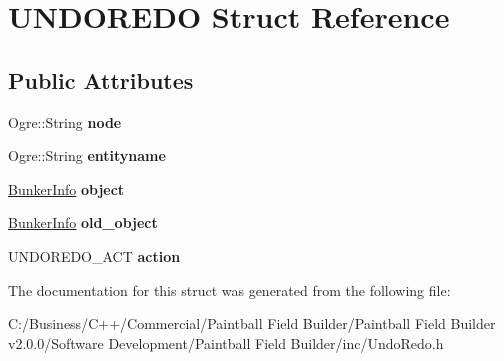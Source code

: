 \hypertarget{struct_u_n_d_o_r_e_d_o}{
\section{UNDOREDO Struct Reference}
\label{struct_u_n_d_o_r_e_d_o}
}
\subsection*{Public Attributes}
\begin{DoxyCompactItemize}
\item 
\hypertarget{struct_u_n_d_o_r_e_d_o_a40e400536f857b0c7885bf94410992e0}{
Ogre::String {\bfseries node}}
\label{struct_u_n_d_o_r_e_d_o_a40e400536f857b0c7885bf94410992e0}

\item 
\hypertarget{struct_u_n_d_o_r_e_d_o_aeec0705a112be8aead229abda745dee9}{
Ogre::String {\bfseries entityname}}
\label{struct_u_n_d_o_r_e_d_o_aeec0705a112be8aead229abda745dee9}

\item 
\hypertarget{struct_u_n_d_o_r_e_d_o_aafff7e173340faf332d52efc27c259bd}{
\hyperlink{struct_bunker_info}{BunkerInfo} {\bfseries object}}
\label{struct_u_n_d_o_r_e_d_o_aafff7e173340faf332d52efc27c259bd}

\item 
\hypertarget{struct_u_n_d_o_r_e_d_o_a30b8b195a7fed6fa4e72cad0060ff4ec}{
\hyperlink{struct_bunker_info}{BunkerInfo} {\bfseries old\_\-object}}
\label{struct_u_n_d_o_r_e_d_o_a30b8b195a7fed6fa4e72cad0060ff4ec}

\item 
\hypertarget{struct_u_n_d_o_r_e_d_o_a0443e6cb40d538ed4371db193e767c49}{
UNDOREDO\_\-ACT {\bfseries action}}
\label{struct_u_n_d_o_r_e_d_o_a0443e6cb40d538ed4371db193e767c49}

\end{DoxyCompactItemize}


The documentation for this struct was generated from the following file:\begin{DoxyCompactItemize}
\item 
C:/Business/C++/Commercial/Paintball Field Builder/Paintball Field Builder v2.0.0/Software Development/Paintball Field Builder/inc/UndoRedo.h\end{DoxyCompactItemize}
